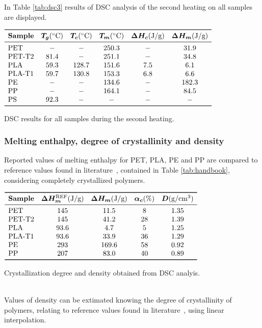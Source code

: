 \documentclass[a4paper, 11pt]{article}
\begin{document}
\newpage
In Table \ref{tab:dsc3} results of DSC analysis of the second heating on all samples are displayed. 
\begin{table}[htp]
\centering
$
\begin{array}{lccccc}
\toprule
\textbf{Sample} & \bm{T_{g}} (\SI{}{\celsius}) & \bm{T_{c}} (\SI{}{\celsius}) & \bm{T_m} (\SI{}{\celsius}) & \bm{\Delta H_{c}} (\si{J/g}) & \bm{\Delta H_m} (\si{J/g}) \\
\midrule
\text{PET} & - & - & 250.3 & - & 31.9 \\
\text{PET-T2} & 81.4 & - & 251.1 & - & 34.8 \\
\text{PLA} & 59.3 & 128.7 & 151.6 & 7.5 & 6.1 \\
\text{PLA-T1} & 59.7 & 130.8 & 153.3 & 6.8 & 6.6 \\
\text{PE} & - & - & 134.6 & - & 182.3 \\
\text{PP} & - & - & 164.1 & - & 84.5 \\
\text{PS} & 92.3 & - & - & - & - \\
\bottomrule
\end{array}
$
\caption{DSC results for all samples during the second heating.}
\label{tab:dsc3}
\end{table}

\subsubsection{Melting enthalpy, degree of crystallinity and density}

Reported values of melting enthalpy for PET, PLA, PE and PP are compared to reference values found in literature~\cite{handbook}, contained in Table \ref{tab:handbook}, considering completely crystallized polymers.
\begin{table}[htp]
\centering
$
\begin{array}{lcccc}
\toprule
\textbf{Sample} & \bm{\Delta H_m^\text{REF}} (\si{J/g})  & \bm{\Delta H_m} (\si{J/g})  & \bm{\alpha_c} (\%) & \bm{D} (\si{g/cm^3}) \\
\midrule
\text{PET} & 145 & 11.5 & 8 & 1.35 \\
\text{PET-T2} & 145 & 41.2 & 28 & 1.39 \\
\text{PLA} & 93.6 & 4.7 & 5 & 1.25\\
\text{PLA-T1} & 93.6 & 33.9 & 36 & 1.29\\
\text{PE} & 293 & 169.6 & 58 & 0.92\\
\text{PP} & 207 & 83.0 & 40 & 0.89 \\
\bottomrule
\end{array}
$
\caption{Crystallization degree and density obtained from DSC analyis.}
\label{tab:handbook}
\end{table}\\
Values of density can be extimated knowing the degree of crystallinity of polymers, relating to reference values found in literature~\cite{handbook}, using linear interpolation. 
\end{document}
